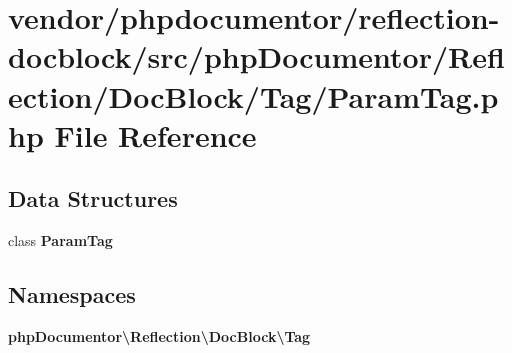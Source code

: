 \section{vendor/phpdocumentor/reflection-\/docblock/src/php\+Documentor/\+Reflection/\+Doc\+Block/\+Tag/\+Param\+Tag.php File Reference}
\label{_param_tag_8php}
\subsection*{Data Structures}
\begin{DoxyCompactItemize}
\item 
class {\bf Param\+Tag}
\end{DoxyCompactItemize}
\subsection*{Namespaces}
\begin{DoxyCompactItemize}
\item 
 {\bf php\+Documentor\textbackslash{}\+Reflection\textbackslash{}\+Doc\+Block\textbackslash{}\+Tag}
\end{DoxyCompactItemize}
